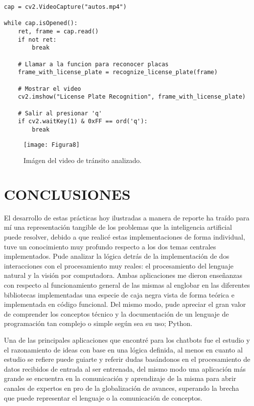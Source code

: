 \documentclass[a4paper,
               ]{jacow}
\begin{document}
\begin{lstlisting}
cap = cv2.VideoCapture("autos.mp4")

while cap.isOpened():
    ret, frame = cap.read()
    if not ret:
        break

    # Llamar a la funcion para reconocer placas
    frame_with_license_plate = recognize_license_plate(frame)

    # Mostrar el video
    cv2.imshow("License Plate Recognition", frame_with_license_plate)

    # Salir al presionar 'q'
    if cv2.waitKey(1) & 0xFF == ord('q'):
        break
\end{lstlisting}

\begin{figure}[!htb]
   \centering
   \captionsetup{justification=centering}
    \texttt{[image: Figura8]}
    \caption{Imágen del video de tránsito analizado.}
\end{figure}

\section{CONCLUSIONES}
El desarrollo de estas prácticas hoy ilustradas a manera de reporte ha traído para mí una representación tangible de los problemas que la inteligencia artificial puede resolver, debido a que realicé estas implementaciones de forma individual, tuve un conocimiento muy profundo respecto a los dos temas centrales implementados. Pude analizar la lógica detrás de la implementación de dos interacciones con el procesamiento muy reales: el procesamiento del lenguaje natural y la visión por computadora. Ambas aplicaciones me dieron enseñanzas con respecto al funcionamiento general de las mismas al englobar en las diferentes bibliotecas implementadas una especie de caja negra vista de forma teórica e implementada en código funcional. Del mismo modo, pude apreciar el gran valor de comprender los conceptos técnico y la documentación de un lenguaje de programación tan complejo o simple según sea su uso; Python.

Una de las principales aplicaciones que encontré para los chatbots fue el estudio y el razonamiento de ideas con base en una lógica definida, al menos en cuanto al estudio se refiere puede guiarte y referir dudas basándonos en el procesamiento de datos recibidos de entrada al ser entrenada, del mismo modo una aplicación más grande se encuentra en la comunicación y aprendizaje de la misma para abrir canales de expertos en pro de la globalización de avances, superando la brecha que puede representar el lenguaje o la comunicación de conceptos.
\end{document}
